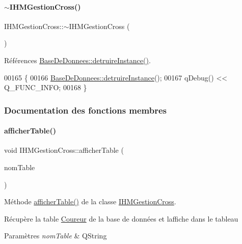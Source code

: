 \paragraph{\texorpdfstring{$\sim$\+I\+H\+M\+Gestion\+Cross()}{~IHMGestionCross()}}
{\footnotesize\ttfamily I\+H\+M\+Gestion\+Cross\+::$\sim$\+I\+H\+M\+Gestion\+Cross (\begin{DoxyParamCaption}{ }\end{DoxyParamCaption})}



Références \hyperlink{class_base_de_donnees_a457401c0816b888c77ce915997545f4e}{Base\+De\+Donnees\+::detruire\+Instance()}.


\begin{DoxyCode}
00165 \{
00166     \hyperlink{class_base_de_donnees_a457401c0816b888c77ce915997545f4e}{BaseDeDonnees::detruireInstance}();
00167     qDebug() << Q\_FUNC\_INFO;
00168 \}
\end{DoxyCode}


\subsubsection{Documentation des fonctions membres}
\mbox{\label{class_i_h_m_gestion_cross_ae1510779a1efa3defecb517467e84f91}} 
\paragraph{\texorpdfstring{afficher\+Table()}{afficherTable()}}
{\footnotesize\ttfamily void I\+H\+M\+Gestion\+Cross\+::afficher\+Table (\begin{DoxyParamCaption}\item[{Q\+String}]{nom\+Table }\end{DoxyParamCaption})\hspace{0.3cm}{\ttfamily [private]}}



Méthode \hyperlink{class_i_h_m_gestion_cross_ae1510779a1efa3defecb517467e84f91}{afficher\+Table()} de la classe \hyperlink{class_i_h_m_gestion_cross}{I\+H\+M\+Gestion\+Cross}. 

Récupère la table \hyperlink{class_coureur}{Coureur} de la base de données et l\textquotesingle{}affiche dans le tableau 
\begin{DoxyParams}{Paramètres}
{\em nom\+Table} & Q\+String \\
\hline
\end{DoxyParams}



